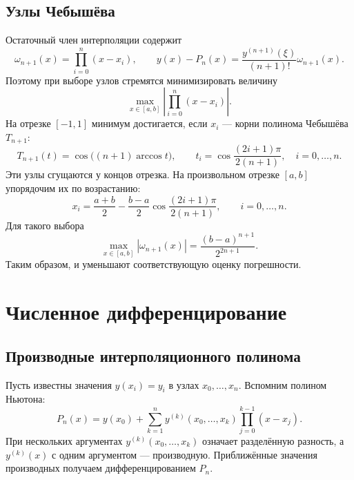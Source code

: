 \documentclass[../final.tex]{subfiles}
\begin{document}
\ifSubfilesClassLoaded{\setcounter{chapter}{4}\setcounter{section}{6}}{}
\captionsetup{font=footnotesize,labelfont=bf,skip=5pt}

\subsection{Узлы Чебышёва}

Остаточный член интерполяции содержит 
\begin{equation*}
    \omega_{n+1}(x)=\prod_{i=0}^{n}(x-x_i),\qquad
    y(x)-P_n(x)=\frac{y^{(n+1)}(\xi)}{(n+1)!}\omega_{n+1}(x).
\end{equation*}
Поэтому при выборе узлов стремятся минимизировать величину
\begin{equation*}
    \max_{x\in[a,b]}\left|\prod_{i=0}^{n}(x-x_i)\right|.
\end{equation*}
На отрезке $[-1,1]$ минимум достигается, если $x_i$ --- корни
полинома Чебышёва $T_{n+1}$:
\begin{equation*}
    T_{n+1}(t)=\cos\bigl((n+1)\arccos t\bigr),\qquad
    t_i=\cos\frac{(2i+1)\pi}{2(n+1)},\quad i=0,\ldots,n.
\end{equation*}
Эти узлы сгущаются у концов отрезка.
На произвольном отрезке $[a,b]$ упорядочим их по возрастанию:
\begin{equation*}
    x_i=\frac{a+b}{2}-\frac{b-a}{2}
    \cos\frac{(2i+1)\pi}{2(n+1)},\qquad i=0,\ldots,n.
\end{equation*}
Для такого выбора
\begin{equation*}
    \max_{x\in[a,b]}|\omega_{n+1}(x)|
    =\frac{(b-a)^{n+1}}{2^{2n+1}}.
\end{equation*}
Таким образом,  и уменьшают соответствующую оценку погрешности.

\section{Численное дифференцирование}

\subsection{Производные интерполяционного полинома}

Пусть известны значения $y(x_i)=y_i$ в узлах $x_0,\ldots,x_n$.
Вспомним полином Ньютона:
\begin{equation*}
    P_n(x)=y(x_0)+\sum_{k=1}^{n}
    y^{(k)}(x_0,\ldots,x_k)\prod_{j=0}^{k-1}(x-x_j).
\end{equation*}
При нескольких аргументах $y^{(k)}(x_0,\ldots,x_k)$ означает
разделённую разность, а $y^{(k)}(x)$ с одним аргументом --- производную.
Приближённые значения производных получаем дифференцированием $P_n$.
\end{document}
